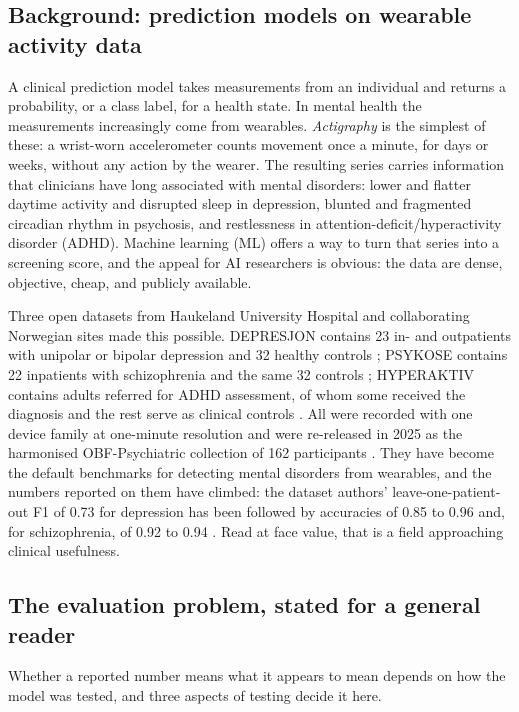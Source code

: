 \documentclass[11pt,a4paper]{article}
\begin{document}
\subsection{Background: prediction models on wearable activity data}
A clinical prediction model takes measurements from an individual and returns a probability, or a
class label, for a health state. In mental health the measurements increasingly come from
wearables. \emph{Actigraphy} is the simplest of these: a wrist-worn accelerometer counts movement
once a minute, for days or weeks, without any action by the wearer. The resulting series carries
information that clinicians have long associated with mental disorders: lower and flatter daytime
activity and disrupted sleep in depression, blunted and fragmented circadian rhythm in psychosis,
and restlessness in attention-deficit/hyperactivity disorder (ADHD). Machine learning (ML) offers a
way to turn that series into a screening score, and the appeal for AI researchers is obvious: the
data are dense, objective, cheap, and publicly available.

Three open datasets from Haukeland University Hospital and collaborating Norwegian sites made this
possible. DEPRESJON contains 23 in- and outpatients with unipolar or bipolar depression and 32
healthy controls \cite{garciaceja2018}; PSYKOSE contains 22 inpatients with schizophrenia and the
same 32 controls \cite{jakobsen2020}; HYPERAKTIV contains adults referred for ADHD assessment, of
whom some received the diagnosis and the rest serve as clinical controls \cite{hicks2021}. All were
recorded with one device family at one-minute resolution and were re-released in 2025 as the
harmonised OBF-Psychiatric collection of 162 participants \cite{obf2025}. They have become the
default benchmarks for detecting mental disorders from wearables, and the numbers reported on them
have climbed: the dataset authors' leave-one-patient-out F1 of 0.73 for depression
\cite{garciaceja2018} has been followed by accuracies of 0.85 to 0.96
\cite{jmir2025,arxiv2303,zanella2019} and, for schizophrenia, of 0.92 to 0.94
\cite{psykose_dl2024,psykose_bspc2024}. Read at face value, that is a field approaching clinical
usefulness.

\subsection{The evaluation problem, stated for a general reader}
Whether a reported number means what it appears to mean depends on how the model was tested, and
three aspects of testing decide it here.
\end{document}
